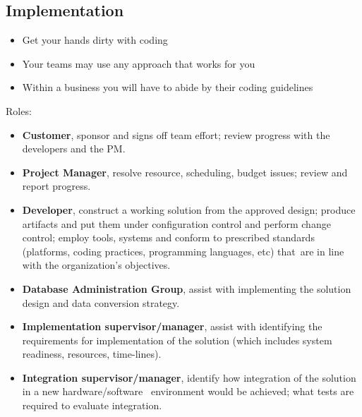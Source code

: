 \documentclass{article}[18pt]
\begin{document}
\subsection{Implementation}
\begin{itemize}
	\item Get your hands dirty with coding
	\item Your teams may use any approach that works for you
	\item Within a business you will have to abide by their coding guidelines
\end{itemize}
Roles:
\begin{itemize}
	\item \textbf{Customer}, sponsor and signs off team effort; review progress with the developers and the PM.
	\item \textbf{Project Manager}, resolve resource, scheduling, budget issues; review and report progress.
	\item \textbf{Developer}, construct a working solution from the approved design; produce artifacts and put them under configuration control and perform change control; employ tools, systems and conform to prescribed standards (platforms, coding practices, programming languages, etc) that are in line with the organization’s objectives.
	\item \textbf{Database Administration Group}, assist with implementing the solution design and data conversion strategy.
	\item \textbf{Implementation supervisor/manager}, assist with identifying the requirements for implementation of the solution (which includes system readiness, resources, time-lines).
	\item \textbf{Integration supervisor/manager}, identify how integration of the solution in a new hardware/software  environment would be achieved; what tests are required to evaluate integration.
\end{itemize}
\end{document}
